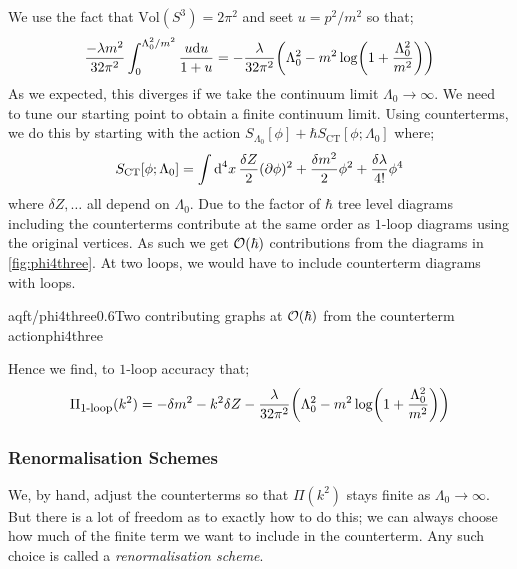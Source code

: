 We use the fact that $\text{Vol}(S^3) = 2\pi^2$ and seet $u = p^2/m^2$ so that;
\begin{equation}
\frac{-\lambda m^2}{32\pi^2} \int_{0}^{\Lambda_0^2/m^2}{\frac{u\ud u}{1 + u}} = - \frac{\lambda}{32\pi^2}\left(\Lambda_0^2 - m^2 \log\left(1 + \frac{\Lambda_0^2}{m^2}\right)\right)
\end{equation}
As we expected, this diverges if we take the continuum limit $\Lambda_0 \rightarrow \infty$. We need to tune our starting point to obtain a finite continuum limit. Using counterterms, we do this by starting with the action $S_{\Lambda_0}[\phi] + \hbar S_{\text{CT}}[\phi;\Lambda_0]$ where;
\begin{equation}
S_{\text{CT}}[\phi;\Lambda_0] = \int{\text{d}^4 x \,\frac{\delta Z}{2}(\partial\phi)^2 + \frac{\delta m^2}{2}\phi^2 + \frac{\delta \lambda}{4!}\phi^4}
\end{equation}
where $\delta Z, \ldots$ all depend on $\Lambda_0$. Due to the factor of $\hbar$ tree level diagrams including the counterterms contribute at the same order as $1$-loop diagrams using the original vertices. As such we get $\mathcal{O}(\hbar)$ contributions from the diagrams in \autoref{fig:phi4three}. At two loops, we would have to include counterterm diagrams with loops.
\begin{mygraphic}{aqft/phi4three}{0.6}{Two contributing graphs at $\mathcal{O}(\hbar)$ from the counterterm action}{phi4three}
\end{mygraphic}
Hence we find, to $1$-loop accuracy that;
\begin{equation}
\label{eq:phi4one}
\Pi_{\text{\footnotesize{1-loop}}}(k^2) = -\delta m^2 - k^2 \delta Z - \frac{\lambda}{32\pi^2}\left(\Lambda_0^2 - m^2 \log\left(1+ \frac{\Lambda_0^2}{m^2}\right)\right)
\end{equation}
\subsubsection{Renormalisation Schemes}
We, by hand, adjust the counterterms so that $\Pi(k^2)$ stays finite as $\Lambda_0 \rightarrow \infty$. But there is a lot of freedom as to exactly how to do this; we can always choose how much of the finite term we want to include in the counterterm. Any such choice is called a \emph{renormalisation scheme}.


